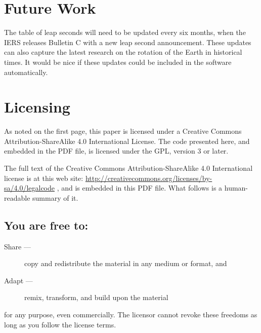 \documentclass[letterpaper,twoside]{article}
\begin{document}
\section{Future Work}
The table of leap seconds will need to be updated every six months,
when the IERS releases Bulletin C with a new leap second announcement.
These updates can also capture the latest research on the rotation
of the Earth in historical times.  It would be nice if these updates
could be included in the software automatically.

\section{Licensing}
\label{section:Licensing}
As noted on the first page, this paper is licensed under a Creative
Commons Attribution-ShareAlike 4.0 International License.  The code
presented here, and embedded in the PDF file, is licensed under
the GPL, version 3 or later.

The full text of the Creative Commons Attribution-ShareAlike 4.0
International license is at this web site:
\url{http://creativecommons.org/licenses/by-sa/4.0/legalcode}%
, and is embedded in this
PDF file.  What follows is a human-readable summary of it.

\subsection{You are free to:}
\begin{description}
\item[Share ---]copy and redistribute the material in any medium or format, and
\item[Adapt ---]remix, transform, and build upon the material
\end{description}
for any purpose, even commercially.  The licensor cannot revoke these
freedoms as long as you follow the license terms.
\end{document}
